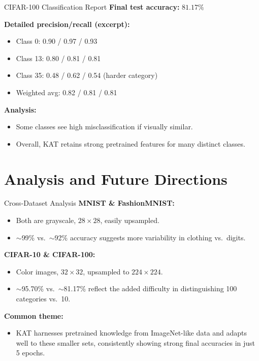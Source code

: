 \documentclass{beamer}
\begin{document}
\begin{frame}{CIFAR-100 Classification Report}
    \textbf{Final test accuracy:} $81.17\%$
    
    \textbf{Detailed precision/recall (excerpt):}
    \begin{itemize}
        \item Class 0: 0.90 / 0.97 / 0.93
        \item Class 13: 0.80 / 0.81 / 0.81
        \item Class 35: 0.48 / 0.62 / 0.54 (harder category)
        \item Weighted avg: 0.82 / 0.81 / 0.81
    \end{itemize}
    
    \vspace{0.8em}
    \textbf{Analysis:}
    \begin{itemize}
        \item Some classes see high misclassification if visually similar.
        \item Overall, KAT retains strong pretrained features for many distinct classes.
    \end{itemize}
\end{frame}

\section{Analysis and Future Directions}
\begin{frame}{Cross-Dataset Analysis}
    \textbf{MNIST \& FashionMNIST:}
    \begin{itemize}
        \item Both are grayscale, $28\times 28$, easily upsampled.
        \item $\sim$99\% vs.\ $\sim$92\% accuracy suggests more variability in clothing vs.\ digits.
    \end{itemize}
    \textbf{CIFAR-10 \& CIFAR-100:}
    \begin{itemize}
        \item Color images, $32\times 32$, upsampled to $224\times 224$.
        \item $\sim$95.70\% vs.\ $\sim$81.17\% reflect the added difficulty in distinguishing 100 categories vs.\ 10.
    \end{itemize}
    \textbf{Common theme:}
    \begin{itemize}
        \item KAT harnesses pretrained knowledge from ImageNet-like data and adapts well to these smaller sets, consistently showing strong final accuracies in just 5 epochs.
    \end{itemize}
\end{frame}
\end{document}
